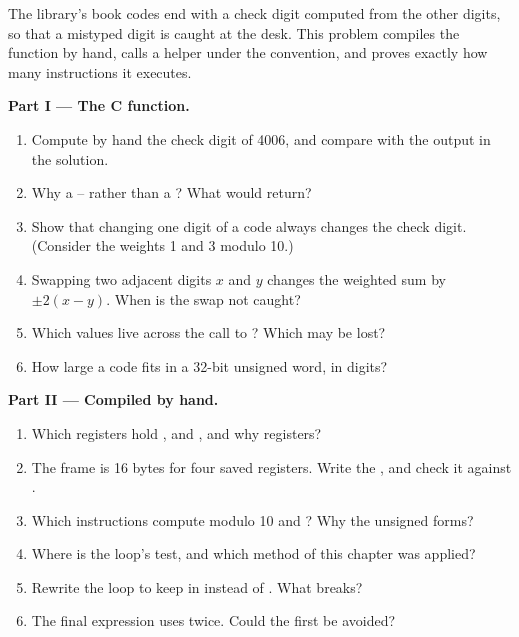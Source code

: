 \begin{problem}\label{pb:b2:assembly-and-calling-convention:1}
The library's book codes end with a check digit computed from the other digits, so that a mistyped digit is caught at
the desk. This problem compiles the function by hand, calls a helper under the convention, and proves exactly how many
instructions it executes.

\medskip\noindent\textbf{Part I --- The C function.}\par\nopagebreak
{}
\begin{enumerate}[beginpenalty=10000]
\item Compute by hand the check digit of 4006, and compare with the output in the solution.
\item Why a -- rather than a ? What would  return?
\item Show that changing one digit of a code always changes the check digit. (Consider the weights 1 and 3
modulo 10.)
\item Swapping two adjacent digits $x$ and $y$ changes the weighted sum by $\pm 2(x - y)$. When is the swap not
caught?
\item Which values live across the call to ? Which may be lost?
\item How large a code fits in a 32-bit unsigned word, in digits?
\end{enumerate}

\medskip\noindent\textbf{Part II --- Compiled by hand.}\par\nopagebreak
{}
\begin{enumerate}[resume, beginpenalty=10000]
\item Which registers hold ,  and , and why  registers?
\item The frame is 16 bytes for four saved registers. Write the , and check it against .
\item Which instructions compute  modulo 10 and ? Why the unsigned forms?
\item Where is the loop's test, and which method of this chapter was applied?
\item Rewrite the loop to keep  in  instead of . What breaks?
\item The final expression uses  twice. Could the first be avoided?
\end{enumerate}


\end{problem}
